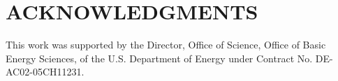 \documentclass{ar-1col}
\begin{document}
\section*{ACKNOWLEDGMENTS}
This work was supported by the Director, Office of Science, Office of Basic Energy Sciences, of the U.S. Department of Energy under Contract No. DE-AC02-05CH11231.





\end{document}
